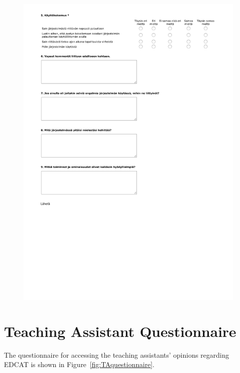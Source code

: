 \begin{figure}
\includegraphics[page=1, width=\textwidth]{images/kysely-opiskelijat2.pdf}
\end{figure}



\chapter{Teaching Assistant Questionnaire}
\label{appendix:TAquestionnaire}

The questionnaire for accessing the teaching assistants' opinions regarding EDCAT is shown in Figure~\ref{fig:TAquestionnaire}.

